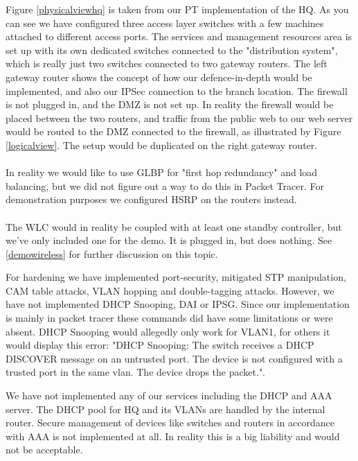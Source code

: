 Figure \ref{physicalviewhq} is taken from our PT implementation of the HQ. As you can see we have configured three access layer switches with a few machines attached to different access ports. The services and management resources area is set up with its own dedicated switches connected to the "distribution system", which is really just two switches connected to two gateway routers. The left gateway router shows the concept of how our defence-in-depth would be implemented, and also our IPSec connection to the branch location. The firewall is not plugged in, and the DMZ is not set up. In reality the firewall would be placed between the two routers, and traffic from the public web to our web server would be routed to the DMZ connected to the firewall, as illustrated by Figure \ref{logicalview}. The setup would be duplicated on the right gateway router.
\\
\\
In reality we would like to use GLBP for "first hop redundancy" and load balancing, but we did not figure out a way to do this in Packet Tracer. For demonstration purposes we configured HSRP on the routers instead.
\\
\\
The WLC would in reality be coupled with at least one standby controller, but we've only included one for the demo. It is plugged in, but does nothing. See \ref{demowireless} for further discussion on this topic.


For hardening we have implemented port-security, mitigated STP manipulation, CAM table attacks, VLAN hopping and double-tagging attacks. However, we have not implemented DHCP Snooping, DAI or IPSG. Since our implementation is mainly in packet tracer these commands did have some limitations or were absent. DHCP Snooping would allegedly only work for VLAN1, for others it would display this error: "DHCP Snooping: The switch receives a DHCP DISCOVER message on an untrusted port. The device is not configured with a trusted port in the same vlan.  The device drops the packet.".

We have not implemented any of our services including the DHCP and AAA server. The DHCP pool for HQ and its VLANs are handled by the internal router. Secure management of devices like switches and routers in accordance with AAA is not implemented at all. In reality this is a big liability and would not be acceptable.


